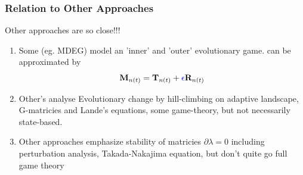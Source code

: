\documentclass{beamer}
\begin{document}
\begin{frame}
\frametitle{Relation to Other Approaches}
Other approaches are so close!!!
\begin{enumerate}
    \item Some (eg. MDEG) model an 'inner' and 'outer' evolutionary game. can be approximated by $$ \mathbf{M}_{n(t)} = \mathbf{T}_{n(t)}+\textcolor{blue}{\epsilon}\mathbf{R}_{n(t)}$$
    \item Other's analyse Evolutionary change by hill-climbing on adaptive landscape, G-matricies and Lande's equations, some game-theory, but not necessarily state-based.
    \item Other approaches emphasize stability of matricies $\partial \lambda=0$ including perturbation analysis, Takada-Nakajima equation, but don't quite go full game theory %
\end{enumerate}
\end{frame}










\end{document}
